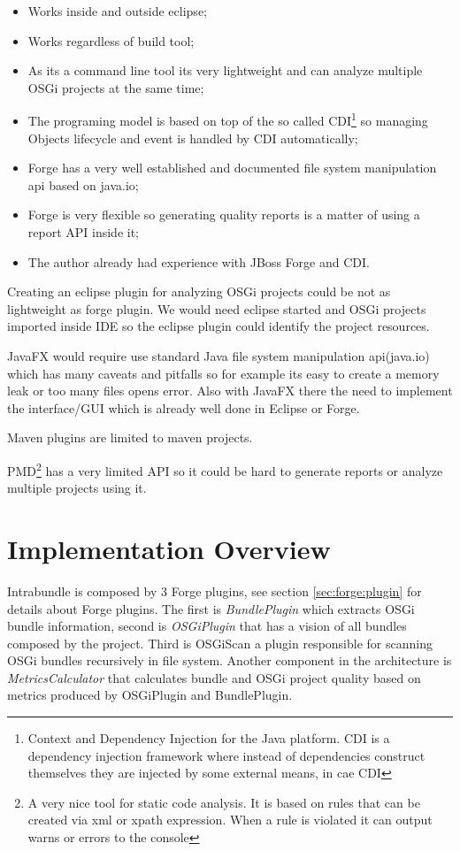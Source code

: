 \begin{itemize}
\item Works inside and outside eclipse;
\item Works regardless of build tool;
\item As its a command line tool its very lightweight and can analyze multiple OSGi projects at the same time;
\item The programing model is based on top of the so called CDI\footnote{Context and Dependency Injection for the Java platform. CDI is a dependency injection framework where instead of dependencies construct themselves they are injected by some external means, in cae CDI} so managing Objects lifecycle and event is handled by CDI automatically;
\item Forge has a very well established and documented file system manipulation api based on java.io;
\item Forge is very flexible so generating quality reports is a matter of using a report API inside it;  
\item The author already had experience with JBoss Forge and CDI. 
\end{itemize}

Creating an eclipse plugin for analyzing OSGi projects could be not as lightweight as forge plugin. We would need eclipse started and OSGi projects imported inside IDE so the eclipse plugin could identify the project resources.

JavaFX would require use standard Java file system manipulation api(java.io) which has many caveats and pitfalls so for example its easy to create a memory leak or too many files opens error. Also with JavaFX there the need to implement the interface/GUI which is already well done in Eclipse or Forge.

Maven plugins are limited to maven projects.

PMD\footnote{A very nice tool for static code analysis. It is based on rules that can be created via xml or xpath expression. When a rule is violated it can output warns or errors to the console} has a very limited API so it could be hard to generate reports or analyze multiple projects using it. 


\section{Implementation Overview}

Intrabundle is composed by 3 Forge plugins, see section \ref{sec:forge:plugin} for details about Forge plugins. The first is \emph{BundlePlugin} which extracts OSGi bundle information, second is \emph{OSGiPlugin} that has a vision of all bundles composed by the project. Third is OSGiScan a plugin responsible for scanning OSGi bundles recursively in file system. Another component in the architecture is \emph{MetricsCalculator} that calculates bundle and OSGi project quality based on metrics produced by OSGiPlugin and BundlePlugin.

